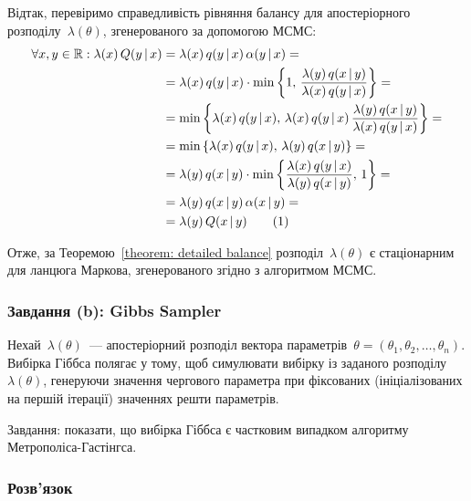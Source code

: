 Відтак, перевіримо справедливість рівняння балансу для апостеріорного розподілу~$\lambda(\theta)$, згенерованого за допомогою МСМС:
\begin{align*}
    \forall x,y \in \mathbb{R}: \lambda(x)\,Q(y\, |\, x) 
        & = \lambda(x)\,q(y\, |\, x)\,\alpha(y\, |\, x) = \\
        & = \lambda(x)\,q(y\, |\, x) \cdot \min\left\{ 
            1,\, \frac{\lambda(y)\,q(x\, |\, y)}{\lambda(x)\,q(y\, |\, x)} 
        \right\} = \\
        & = \min\left\{ 
            \lambda(x)\,q(y\, |\, x),\, \lambda(x)\,q(y\, |\, x)\,\frac{\lambda(y)\,q(x\, |\, y)}{\lambda(x)\, q(y\, |\, x)}
        \right\} = \\
        & = \min\left\{ 
            \lambda(x)\,q(y\, |\, x),\, \lambda(y)\,q(x\, |\, y)
        \right\} = \\
        & = \lambda(y)\,q(x\, |\, y) \cdot \min\left\{ 
            \frac{\lambda(x)\,q(y\, |\, x)}{\lambda(y)\,q(x\, |\, y)},\, 1
        \right\} = \\
        & = \lambda(y)\,q(x\, |\, y)\,\alpha(x\, |\, y) = \\
        & = \lambda(y)\,Q(x\, |\, y) \stepcounter{equation}\tag{\theequation}
\end{align*}

Отже, за Теоремою~\ref{theorem: detailed balance} розподіл~$\lambda(\theta)$ є стаціонарним для ланцюга Маркова, згенерованого згідно з алгоритмом МСМС.

\subsubsection*{Завдання (b): Gibbs Sampler}

Нехай~$\lambda(\theta)$~--- апостеріорний розподіл вектора параметрів~$\theta=(\theta_1,\theta_2,\ldots,\theta_n)$. Вибірка Гіббса полягає у тому, щоб симулювати вибірку із заданого розподілу~$\lambda(\theta)$, генеруючи значення чергового параметра при фіксованих (ініціалізованих на першій ітерації) значеннях решти параметрів.

Завдання: показати, що вибірка Гіббса є частковим випадком алгоритму Метрополіса-Гастінгса.

\subsubsection*{Розв'язок}

